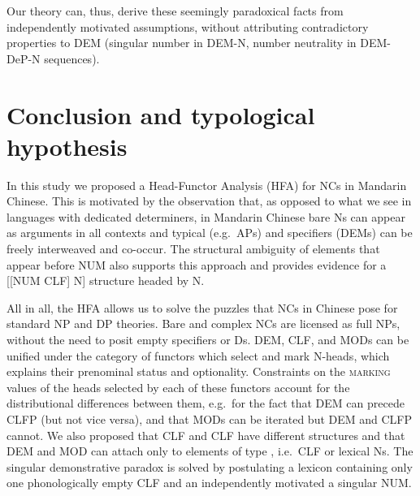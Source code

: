 \documentclass[output=paper,colorlinks,citecolor=brown]{langscibook}
\begin{document}
Our theory can, thus, derive these seemingly paradoxical facts from independently motivated assumptions, without  attributing contradictory properties to DEM (singular number in DEM-N, number neutrality in DEM-DeP-N sequences).


\section{Conclusion and typological hypothesis}\label{sec:conc:deng}

In this study we proposed a Head-Functor Analysis (HFA) for NCs in Mandarin Chinese. This is motivated by the observation that, as opposed to what we see in languages with dedicated determiners, in Mandarin Chinese bare Ns can appear as arguments in all contexts and typical  (e.g.\ APs) and  specifiers (DEMs) can be freely interweaved and co-occur. The structural ambiguity of elements that appear before NUM also supports this approach and provides evidence for a  [[NUM CLF] N] structure headed by N.

All in all, the HFA allows us to solve the puzzles that NCs in Chinese pose for standard NP and DP theories. Bare and complex NCs are licensed as full NPs, without the need to posit empty specifiers or Ds. DEM, CLF,  and MODs can be unified under the category of functors which select and mark N-heads, which explains their prenominal status and optionality. Constraints on the \textsc{marking} values of the heads selected by each of these functors account for the distributional differences between them, e.g.\ for the fact that DEM can precede CLFP (but not vice versa), and that MODs can be iterated but DEM and CLFP cannot. We also proposed that CLF and CLF have different structures and that DEM and MOD can attach only to elements of type , i.e.\ CLF or lexical Ns. The singular demonstrative paradox is solved by postulating a lexicon containing only one phonologically empty CLF and an independently motivated a singular NUM.%


\end{document}
